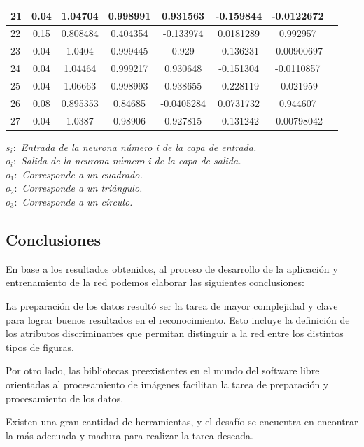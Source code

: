 \documentclass[pdftex,a4paper,12pt]{article}
\begin{document}
\begin{tabular}{|l|c|c|c|c|c|c|c|}
\hline
21 & 0.04 & 1.04704 & 0.998991 & 0.931563 & -0.159844 & -0.0122672\\
\hline
22 & 0.15 & 0.808484 & 0.404354 & -0.133974 & 0.0181289 & 0.992957\\
\hline
23 & 0.04 & 1.0404 & 0.999445 & 0.929 & -0.136231 & -0.00900697\\
\hline
24 & 0.04 & 1.04464 & 0.999217 & 0.930648 & -0.151304 & -0.0110857\\
\hline
25 & 0.04 & 1.06663 & 0.998993 & 0.938655 & -0.228119 & -0.021959\\
\hline
26 & 0.08 & 0.895353 & 0.84685 & -0.0405284 & 0.0731732 & 0.944607\\
\hline
27 & 0.04 & 1.0387 & 0.98906 & 0.927815 & -0.131242 & -0.00798042\\
\hline
  
\end{tabular}	      
	        
  $ s_{i}:  $	 \textit{ Entrada de la neurona n\'umero i de la capa de entrada.}\\
  $ o_{i}:  $	 \textit{ Salida de la neurona n\'umero i de la capa de salida. }\\
  $ o_{1}:  $	 \textit{ Corresponde a un cuadrado.}\\
  $ o_{2}:  $	 \textit{ Corresponde a un tri\'angulo.}\\
  $ o_{3}:  $	 \textit{ Corresponde a un c\'irculo.}\\

\newpage
\subsection{Conclusiones} %

	En base a los resultados obtenidos, al proceso de desarrollo de la aplicaci\'on y
	entrenamiento de la red podemos elaborar las siguientes conclusiones:
	
	La preparaci\'on de los datos result\'o ser la tarea de mayor complejidad y clave para
	lograr buenos resultados en el reconocimiento. Esto incluye la definici\'on de los atributos
	discriminantes que permitan distinguir a la red entre los distintos tipos de figuras.
	
	Por otro lado, las bibliotecas preexistentes en el mundo del software libre orientadas
	al procesamiento de im\'agenes facilitan la tarea de preparaci\'on y procesamiento 
	de los datos.

	Existen una gran cantidad de herramientas, y el desaf\'io se encuentra en encontrar
	la m\'as adecuada y madura para realizar la tarea deseada.
\end{document}
